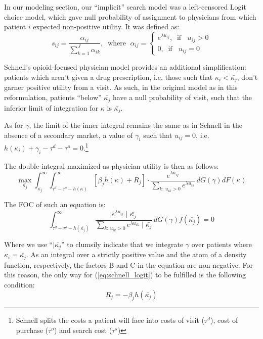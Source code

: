 \documentclass{article}
\begin{document}
In our modeling section, our ``implicit'' search model was a left-censored Logit choice model, which gave null probability of assignment to physicians from which patient $i$ expected non-positive utility. It was defined as:
\[
s_{ij} = \frac{\alpha_{ij}}{\sum_{k = 1}^{J} \alpha_{ik}}, \; \; \text{where } \; \alpha_{ij} = \begin{cases}
e^{\lambda u_{ij}}, \; \; \text{if } \; \; u_{ij} > 0 \\
0 , \; \; \text{if } \; \; u_{ij} = 0
\end{cases}
\]

Schnell's opioid-focused physician model provides an additional simplification: patients which aren't given a drug prescription, i.e. those such that $\kappa_i < \bar{\kappa_j}$, don't garner positive utility from a visit. As such, in the original model as in this reformulation, patients ``below'' $\bar{\kappa_j}$ have a null probability of visit, such that the inferior limit of integration for $\kappa$ is $\bar{\kappa_j}$.

As for $\gamma$, the limit of the inner integral remains the same as in Schnell in the absence of a secondary market, a value of $\gamma_i$ such that $u_{ij} = 0$, i.e. $h(\kappa_i) + \gamma_i - \tau^d - \tau^o = 0$.\footnote{Schnell splits the costs a patient will face into costs of visit ($\tau^d$), cost of purchase ($\tau^o$) and search cost ($\tau^s$)}

The double-integral maximized as physician utility is then as follows:
\[
\max_{\bar{\kappa_j}}\int_{\bar{\kappa_j}}^{\infty} \int_{\tau^d - \tau^o - h(\kappa)}^{\infty} [\beta_j h(\kappa) + R_j] \cdot \frac{e^{\lambda u_{ij}}}{\sum \limits_{k : \, u_{ik} > 0} e^{\lambda u_{ik}}} \, dG(\gamma) dF(\kappa)
\]

The FOC of such an equation is:
\begin{equation}
[\beta_j h(\bar{\kappa_j}) + R_j]\int_{\tau^d - \tau^o - h(\bar{\kappa_j})}^{\infty} \frac{e^{\lambda u_{ij}} \mid \bar{\kappa_j}}{\sum \limits_{k : \, u_{ik} > 0} e^{\lambda u_{ik}} \mid \bar{\kappa_j}} \, dG(\gamma) f(\bar{\kappa_j}) = 0 
\label{eq:schnell_logit}
\end{equation}


Where we use ``$\mid \bar{\kappa_j}$'' to clumsily indicate that we integrate $\gamma$ over patients where $\kappa_i = \bar{\kappa_j}$. As an integral over a strictly positive value and the atom of a density function, respectively, the factors B and C in the equation are non-negative. For this reason, the only way for (\ref{eq:schnell_logit}) to be fulfilled is the following condition:
\begin{equation}
    R_j = - \beta_j h(\bar{\kappa_j})
    \label{eq:schnell_condition}
\end{equation}
\end{document}
